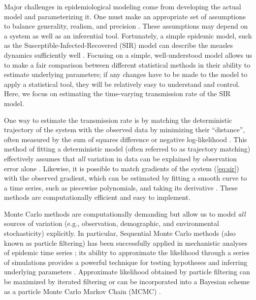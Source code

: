 \documentclass{article}
\newcommand{\eref}[1]{(\ref{eq:#1})}
\begin{document}
Major challenges in epidemiological modeling come from developing the actual model and parameterizing it.
One must make an appropriate set of assumptions to balance generality, realism, and precision \citep{levins1966strategy}.
These assumptions may depend on a system as well as an inferential tool.
Fortunately, a simple epidemic model, such as the Susceptible-Infected-Recovered (SIR) model can describe the measles dynamics sufficiently well \citep{earn2000simple, krylova2013effects, hempel2015century, dalziel2016persistent}.
Focusing on a simple, well-understood model allows us to make a fair comparison between different statistical methods in their ability to estimate underlying parameters;
if any changes have to be made to the model to apply a statistical tool, they will be relatively easy to understand and control.
Here, we focus on estimating the time-varying transmission rate of the SIR model.

One way to estimate the transmission rate is by matching the deterministic trajectory of the system with the observed data by minimizing their ``distance'', often measured by the sum of squares difference or negative log-likelihood \citep{riley2003transmission, chowell2004basic}.
This method of fitting a deterministic model (often referred to as trajectory matching) effectively assumes that \emph{all} variation in data can be explained by observation error alone \citep{bolker2008ecological}.
Likewise, it is possible to match gradients of the system \eref{sir} with the observed gradient, which can be estimated by fitting a smooth curve to a time series, such as piecewise polynomials, and taking its derivative \citep{ellner2002fitting}.
These methods are computationally efficient and easy to implement.

Monte Carlo methods are computationally demanding but allow us to model \emph{all} sources of variation (e.g., observation, demographic, and environmental stochasticity) explicitly.
In particular, Sequential Monte Carlo methods (also known as particle filtering) has been successfully applied in mechanistic analyses of epidemic time series \citep{he2009plug, he2011mechanistic, didelot2017model}; its ability to approximate the likelihood through a series of simulations provides a powerful technique for testing hypotheses and inferring underlying parameters \citep{ionides2006inference, breto2009time, king2015statistical}.
Approximate likelihood obtained by particle filtering can be maximized by iterated filtering \citep{ionides2011iterated, ionides2015inference} or can be incorporated into a Bayesian scheme as a particle Monte Carlo Markov Chain (MCMC) \citep{andrieu2010particle}.
\end{document}
